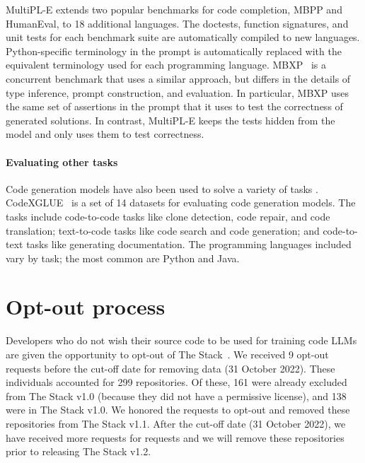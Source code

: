 \documentclass[10pt]{article} \usepackage{iclr2023_conference,times}
\begin{document}
MultiPL-E \citep{cassano2022multiple} extends two popular benchmarks for code completion, MBPP and HumanEval, to 18 additional languages. The doctests, function signatures, and unit tests for each benchmark suite are automatically compiled to new languages. Python-specific terminology in the prompt is automatically replaced with the equivalent terminology used for each programming language.
MBXP~\citep{mbxp} is a concurrent benchmark that uses a similar approach, but differs in the details of type inference, prompt construction, and evaluation. In particular, MBXP uses the same set of assertions in the prompt that it uses to test the correctness of generated solutions. In contrast, MultiPL-E keeps the tests hidden from the model and only uses them to test correctness.

\paragraph{Evaluating other tasks}

Code generation models have also been used to solve a variety of tasks \citep{tufano2020unit,feng2020codebert,ahmed2022multilingual,hellendoorn:dl-ti,pradel:typewriter}. CodeXGLUE~\citep{lu2021codexglue} is a set of 14 datasets for evaluating code generation models. The tasks include code-to-code tasks like clone detection, code repair, and code translation; text-to-code tasks like code search and code generation; and code-to-text tasks like generating documentation. The programming languages included vary by task; the most common are Python and Java. 

\section{Opt-out process}
Developers who do not wish their source code to be used for training code LLMs are given the opportunity to opt-out of The Stack~\citep{Kocetkov2022TheStack}.  We received 9 opt-out requests before the cut-off date for removing data (31 October 2022). These individuals accounted for 299 repositories. Of these, 161 were already excluded from The Stack v1.0 (because they did not have a permissive license), and 138 were in The Stack v1.0. We honored the requests to opt-out and removed these repositories from The Stack v1.1. After the cut-off date (31 October 2022), we have received more requests for requests and we will remove these repositories prior to releasing The Stack v1.2.
\end{document}
